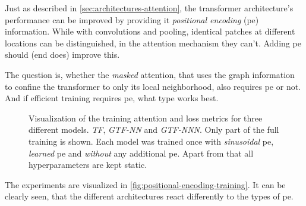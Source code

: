 Just as described in \autoref{sec:architectures-attention}, the transformer architecture's performance can be improved by providing it \emph{positional encoding} (pe) information.
While with convolutions and pooling, identical patches at different locations can be distinguished, in the attention mechanism they can't.
Adding pe should (end does) improve this.

The question is, whether the \emph{masked} attention, that uses the graph information to confine the transformer to only its local neighborhood, also requires pe or not. 
And if efficient training requires pe, what type works best.

\begin{figure}[htbp]
    \centering
    \caption{Visualization of the training attention and loss metrics for three different models. \emph{TF}, \emph{GTF-NN} and \emph{GTF-NNN}.
    Only part of the full training is shown. 
    Each model was trained once with \emph{sinusoidal} pe, \emph{learned} pe and \emph{without} any additional pe.
    Apart from that all hyperparameters are kept static.
    }
    \label{fig:positional-encoding-training}
\end{figure}

The experiments are visualized in \autoref{fig:positional-encoding-training}.
It can be clearly seen, that the different architectures react differently to the types of pe.

